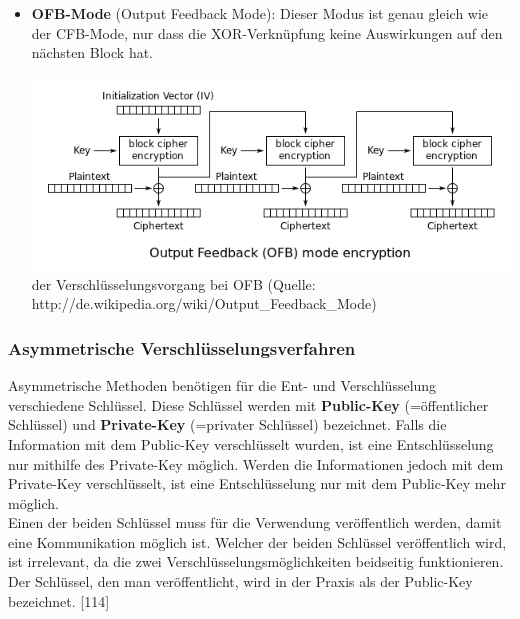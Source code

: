 \documentclass[12pt,a4paper]{report}
\begin{document}
\begin{onehalfspace}
\begin{itemize}
\item \textbf{OFB-Mode} (Output Feedback Mode): Dieser Modus ist genau gleich wie der CFB-Mode, nur dass die XOR-Verknüpfung keine Auswirkungen auf den nächsten Block hat.

\begin{center}
\includegraphics[scale=0.7]{img/ofb.png}\\
der Verschlüsselungsvorgang bei OFB (Quelle: http://de.wikipedia.org/wiki/Output\_Feedback\_Mode)
\end{center}

\end{itemize}

\subsubsection{Asymmetrische Verschlüsselungsverfahren}

Asymmetrische Methoden benötigen für die Ent- und Verschlüsselung verschiedene Schlüssel. Diese Schlüssel werden mit \textbf{Public-Key} (=öffentlicher Schlüssel) und \textbf{Private-Key} (=privater Schlüssel) bezeichnet. Falls die Information mit dem Public-Key verschlüsselt wurden, ist eine Entschlüsselung nur mithilfe des Private-Key möglich. Werden die Informationen jedoch mit dem Private-Key verschlüsselt, ist eine Entschlüsselung nur mit dem Public-Key mehr möglich.\\
Einen der beiden Schlüssel muss für die Verwendung veröffentlich werden, damit eine Kommunikation möglich ist. Welcher der beiden Schlüssel veröffentlich wird, ist irrelevant, da die zwei Verschlüsselungsmöglichkeiten beidseitig funktionieren. Der Schlüssel, den man veröffentlicht, wird in der Praxis als der Public-Key bezeichnet. [114]\\


\end{onehalfspace}
\end{document}
